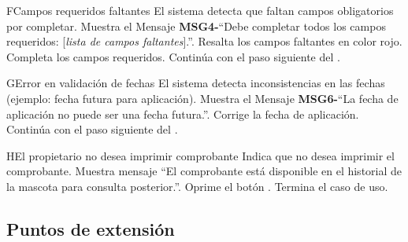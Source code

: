 \begin{UCtrayectoriaA}{F}{Campos requeridos faltantes}
    \UCpaso El sistema detecta que faltan campos obligatorios por completar.
    \UCpaso Muestra el Mensaje {\bf MSG4-}``Debe completar todos los campos requeridos: [{\em lista de campos faltantes}].''.
    \UCpaso Resalta los campos faltantes en color rojo.
    \UCpaso[\UCactor] Completa los campos requeridos.
    \UCpaso Continúa con el paso siguiente del .
\end{UCtrayectoriaA}

\begin{UCtrayectoriaA}{G}{Error en validación de fechas}
    \UCpaso El sistema detecta inconsistencias en las fechas (ejemplo: fecha futura para aplicación).
    \UCpaso Muestra el Mensaje {\bf MSG6-}``La fecha de aplicación no puede ser una fecha futura.''.
    \UCpaso[\UCactor] Corrige la fecha de aplicación.
    \UCpaso Continúa con el paso siguiente del .
\end{UCtrayectoriaA}

\begin{UCtrayectoriaA}{H}{El propietario no desea imprimir comprobante}
    \UCpaso[\UCactor] Indica que no desea imprimir el comprobante.
    \UCpaso Muestra mensaje ``El comprobante está disponible en el historial de la mascota para consulta posterior.''.
    \UCpaso[\UCactor] Oprime el botón .
    \UCpaso Termina el caso de uso.
\end{UCtrayectoriaA}

\subsection{Puntos de extensión}




